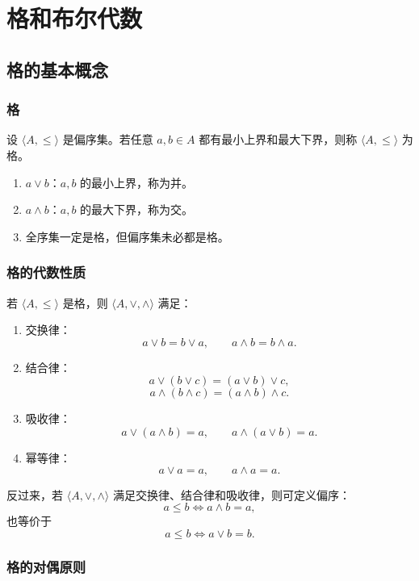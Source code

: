 \section{格和布尔代数}

\subsection{格的基本概念}

\subsubsection{格}

设 \(\langle A,\le\rangle\) 是偏序集。若任意 \(a,b\in A\) 都有最小上界和最大下界，则称 \(\langle A,\le\rangle\) 为格。

\begin{enumerate}
	\item \(a\vee b\)：\(a,b\) 的最小上界，称为并。
	\item \(a\wedge b\)：\(a,b\) 的最大下界，称为交。
	\item 全序集一定是格，但偏序集未必都是格。
\end{enumerate}

\subsubsection{格的代数性质}

若 \(\langle A,\le\rangle\) 是格，则 \(\langle A,\vee,\wedge\rangle\) 满足：
\begin{enumerate}
	\item 交换律：
	\[
	a\vee b=b\vee a,\qquad a\wedge b=b\wedge a.
	\]
	\item 结合律：
	\[
	a\vee(b\vee c)=(a\vee b)\vee c,
	\]
	\[
	a\wedge(b\wedge c)=(a\wedge b)\wedge c.
	\]
	\item 吸收律：
	\[
	a\vee(a\wedge b)=a,\qquad a\wedge(a\vee b)=a.
	\]
	\item 幂等律：
	\[
	a\vee a=a,\qquad a\wedge a=a.
	\]
\end{enumerate}

反过来，若 \(\langle A,\vee,\wedge\rangle\) 满足交换律、结合律和吸收律，则可定义偏序：
\[
a\le b\Leftrightarrow a\wedge b=a,
\]
也等价于
\[
a\le b\Leftrightarrow a\vee b=b.
\]

\subsubsection{格的对偶原则}

